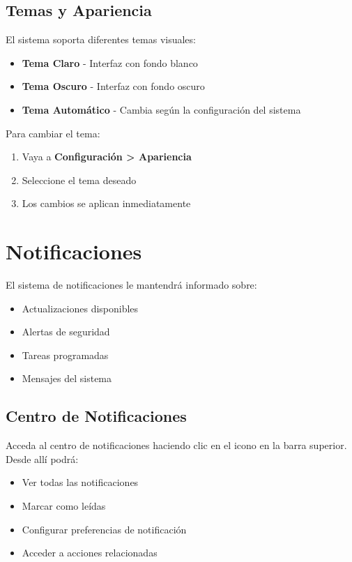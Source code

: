 \subsection{Temas y Apariencia}

El sistema soporta diferentes temas visuales:

\begin{itemize}
    \item \textbf{Tema Claro} - Interfaz con fondo blanco
    \item \textbf{Tema Oscuro} - Interfaz con fondo oscuro
    \item \textbf{Tema Automático} - Cambia según la configuración del sistema
\end{itemize}

Para cambiar el tema:
\begin{enumerate}
    \item Vaya a \textbf{Configuración > Apariencia}
    \item Seleccione el tema deseado
    \item Los cambios se aplican inmediatamente
\end{enumerate}

\section{Notificaciones}

El sistema de notificaciones le mantendrá informado sobre:

\begin{itemize}
    \item Actualizaciones disponibles
    \item Alertas de seguridad
    \item Tareas programadas
    \item Mensajes del sistema
\end{itemize}

\subsection{Centro de Notificaciones}

Acceda al centro de notificaciones haciendo clic en el icono  en la barra superior. Desde allí podrá:

\begin{itemize}
    \item Ver todas las notificaciones
    \item Marcar como leídas
    \item Configurar preferencias de notificación
    \item Acceder a acciones relacionadas
\end{itemize}

